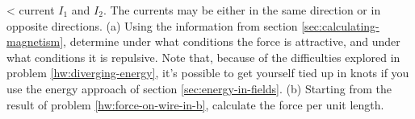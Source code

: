 <%
current $I_1$ and $I_2$. The currents may be either in the
same direction or in opposite directions. (a) Using the
information from section \ref{sec:calculating-magnetism}, determine under what
conditions the force is attractive, and under what
conditions it is repulsive. Note that, because of the
difficulties explored in problem \ref{hw:diverging-energy}, it's possible to
get yourself tied up in knots if you use the energy approach
of section \ref{sec:energy-in-fields}. (b) Starting from the result of problem \ref{hw:force-on-wire-in-b},
calculate the force per unit length.
